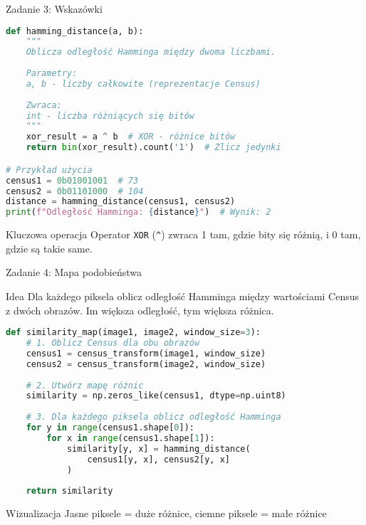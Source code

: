\documentclass[9pt]{beamer}
\begin{document}
\begin{frame}[fragile]{Zadanie 3: Wskazówki}
\begin{lstlisting}[language=Python, caption={Prosta implementacja w Pythonie}]
def hamming_distance(a, b):
    """
    Oblicza odległość Hamminga między dwoma liczbami.
    
    Parametry:
    a, b - liczby całkowite (reprezentacje Census)
    
    Zwraca:
    int - liczba różniących się bitów
    """
    xor_result = a ^ b  # XOR - różnice bitów
    return bin(xor_result).count('1')  # Zlicz jedynki

# Przykład użycia
census1 = 0b01001001  # 73
census2 = 0b01101000  # 104
distance = hamming_distance(census1, census2)
print(f"Odległość Hamminga: {distance}")  # Wynik: 2
\end{lstlisting}

\begin{alertblock}{Kluczowa operacja}
Operator \texttt{XOR} (\texttt{\^}) zwraca 1 tam, gdzie bity się różnią, i 0 tam, gdzie są takie same.
\end{alertblock}
\end{frame}


\begin{frame}[fragile]{Zadanie 4: Mapa podobieństwa}
\begin{block}{Idea}
Dla każdego piksela oblicz odległość Hamminga między wartościami Census z dwóch obrazów. Im większa odległość, tym większa różnica.
\end{block}

\begin{lstlisting}[language=Python, basicstyle=\tiny\ttfamily, caption={Szkielet funkcji}]
def similarity_map(image1, image2, window_size=3):
    # 1. Oblicz Census dla obu obrazów
    census1 = census_transform(image1, window_size)
    census2 = census_transform(image2, window_size)
    
    # 2. Utwórz mapę różnic
    similarity = np.zeros_like(census1, dtype=np.uint8)
    
    # 3. Dla każdego piksela oblicz odległość Hamminga
    for y in range(census1.shape[0]):
        for x in range(census1.shape[1]):
            similarity[y, x] = hamming_distance(
                census1[y, x], census2[y, x]
            )
    
    return similarity
\end{lstlisting}

\begin{exampleblock}{Wizualizacja}
Jasne piksele = duże różnice, ciemne piksele = małe różnice
\end{exampleblock}

\end{frame}
\end{document}

